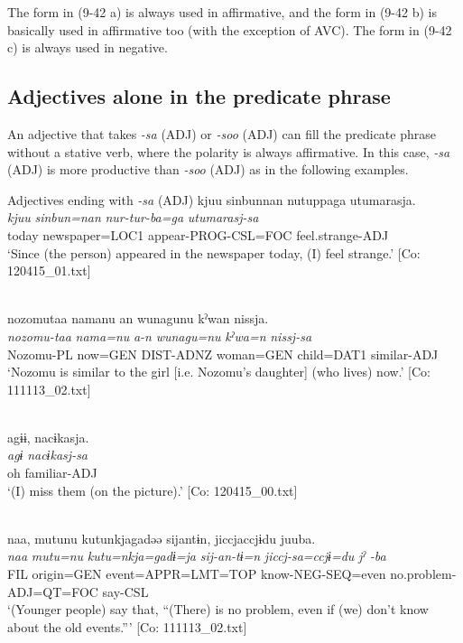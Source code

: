 The form in (9-42 a) is always used in affirmative, and the form in (9-42 b) is basically used in affirmative too (with the exception of AVC). The form in (9-42 c) is always used in negative.

\subsection{Adjectives alone in the predicate phrase}\label{sec:9.2.1}

An adjective that takes \textit{{}-sa} (ADJ) or \textit{{}-soo} (ADJ) can fill the predicate phrase without a stative verb, where the polarity is always affirmative. In this case, \textit{{}-sa} (ADJ) is more productive than \textit{{}-soo} (ADJ) as in the following examples.

\ea   \label{ex:9.43}
\exi{} Adjectives ending with \textit{{}-sa} (ADJ) 
\ea %
 \glll  kjuu  sinbunnan  nutuppaga  utumarasja.\\
      \textit{kjuu}  \textit{sinbun=nan}  \textit{nur-tur-ba=ga}  \textit{utumarasj-sa}\\
      today  newspaper=LOC1  appear-PROG-CSL=FOC  feel.strange-ADJ\\
      \glt       ‘Since (the person) appeared in the newspaper today, (I) feel strange.’ [Co: 120415\_01.txt]

  \ex{}\\
\glll nozomutaa  namanu  an  wunagunu  kˀwan   nissja.\\
      \textit{nozomu-taa}  \textit{nama=nu}  \textit{a-n}  \textit{wunagu=nu}  \textit{kˀwa=n} \textit{nissj-sa}\\
      Nozomu-PL  now=GEN  DIST-ADNZ  woman=GEN  child=DAT1  similar-ADJ\\
      \glt    ‘Nozomu is similar to the girl [i.e. Nozomu’s daughter] (who lives) now.’  [Co: 111113\_02.txt]

 \ex\relax [= (4-50 a)]\\
    \glll  agɨɨ,  nacɨkasja.\\
      \textit{agɨ}  \textit{nacɨkasj-sa}\\
      oh  familiar-ADJ\\
      \glt       ‘(I) miss them (on the picture).’ [Co: 120415\_00.txt]

 \ex\relax  [= (8-104 a)]\\
    \glll  naa,  mutunu  kutunkjagadəə  sijantɨn,  jiccjaccjɨdu  juuba.\\
      \textit{naa}  \textit{mutu=nu}  \textit{kutu=nkja=gadɨ=ja}  \textit{sij-an-tɨ=n}     \textit{jiccj-sa=ccjɨ=du}  \textit{jˀ} \textit{-ba}\\
      FIL  origin=GEN  event=APPR=LMT=TOP  know-NEG-SEQ=even  no.problem-ADJ=QT=FOC  say-CSL\\
      \glt       ‘(Younger people) say that, “(There) is no problem, even if (we) don’t know about the old events.”’ [Co: 111113\_02.txt]

